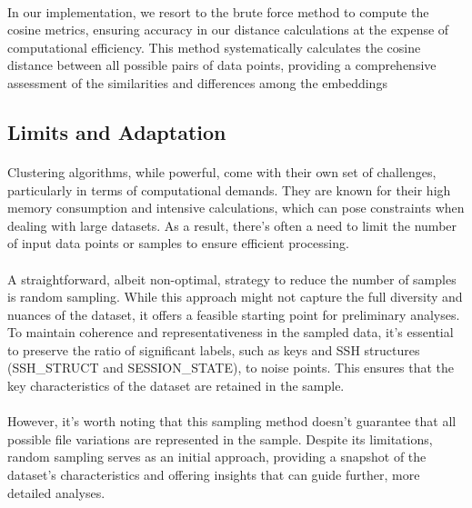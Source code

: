     \paragraph{}In our implementation, we resort to the brute force method to compute the cosine metrics, ensuring accuracy in our distance calculations at the expense of computational efficiency. This method systematically calculates the cosine distance between all possible pairs of data points, providing a comprehensive assessment of the similarities and differences among the embeddings

\subsection{Limits and Adaptation}
    \paragraph{}Clustering algorithms, while powerful, come with their own set of challenges, particularly in terms of computational demands. They are known for their high memory consumption and intensive calculations, which can pose constraints when dealing with large datasets. As a result, there's often a need to limit the number of input data points or samples to ensure efficient processing.
    
    \paragraph{}A straightforward, albeit non-optimal, strategy to reduce the number of samples is random sampling. While this approach might not capture the full diversity and nuances of the dataset, it offers a feasible starting point for preliminary analyses. To maintain coherence and representativeness in the sampled data, it's essential to preserve the ratio of significant labels, such as keys and SSH structures (SSH\_STRUCT and SESSION\_STATE), to noise points. This ensures that the key characteristics of the dataset are retained in the sample.
    
    \paragraph{}However, it's worth noting that this sampling method doesn't guarantee that all possible file variations are represented in the sample. Despite its limitations, random sampling serves as an initial approach, providing a snapshot of the dataset's characteristics and offering insights that can guide further, more detailed analyses.
    